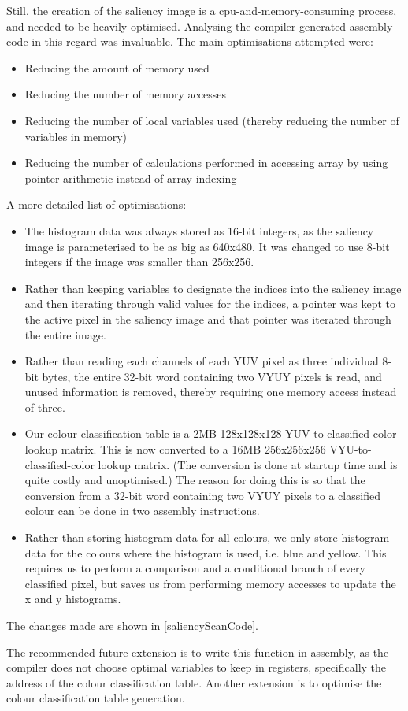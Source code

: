 \documentclass[pdftex,11pt,a4paper]{report}
\renewcommand{\vref}[1]{\autoref{#1}\vpageref{#1}}
\begin{document}
Still, the creation of the saliency image is a cpu-and-memory-consuming process,
and needed to be heavily optimised.  Analysing the compiler-generated assembly
code in this regard was invaluable.  The main optimisations attempted were:
\begin{itemize}
  \item Reducing the amount of memory used
  \item Reducing the number of memory accesses
  \item Reducing the number of local variables used (thereby reducing the
number of variables in memory)
  \item Reducing the number of calculations performed in accessing array by
using pointer arithmetic instead of array indexing
\end{itemize}
\begin{notesfornextyear}
A more detailed list of optimisations:
\begin{itemize}
  \item The histogram data was always stored as 16-bit integers, as the
saliency image is parameterised to be as big as 640x480.  It was changed to
use 8-bit integers if the image was smaller than 256x256.
  \item Rather than keeping variables to designate the indices into the
saliency image and then iterating through valid values for the indices, a
pointer was kept to the active pixel in the saliency image and that
pointer was iterated through the entire image.
  \item Rather than reading each channels of each YUV pixel as three individual
8-bit bytes, the entire 32-bit word containing two VYUY pixels is read, and
unused information is removed, thereby requiring one memory access instead of
three.
  \item Our colour classification table is a 2MB 128x128x128
YUV-to-classified-color lookup matrix.  This is now converted to a 16MB
256x256x256 VYU-to-classified-color lookup matrix.  (The conversion is done at
startup time and is quite costly and unoptimised.)  The reason for doing this is
so that the conversion from a 32-bit word containing two VYUY pixels to a
classified colour can be done in two assembly instructions.
  \item Rather than storing histogram data for all colours, we only store
histogram data for the colours where the histogram is used, i.e. blue and yellow.
 This requires us to perform a comparison and a conditional branch of every
classified pixel, but saves us from performing memory accesses to update the x
and y histograms.
\end{itemize}
The changes made are shown in \vref{saliencyScanCode}.

The recommended future extension is to write this function in assembly, as the
compiler does not choose optimal variables to keep in registers, specifically
the address of the colour classification table.  Another extension is to optimise
the colour classification table generation.
\end{notesfornextyear}
\end{document}
